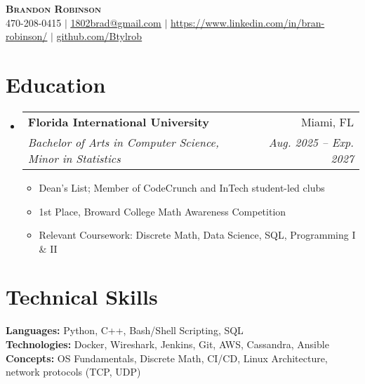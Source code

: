 \documentclass[letterpaper,11pt]{article}
\makeatletter
\newcommand{\resumeItem}[1]{
  \item\small{
    {#1 \vspace{-2pt}}
  }
}
\newcommand{\resumeSubheading}[4]{
  \vspace{-2pt}\item
    \begin{tabular*}{0.97\textwidth}[t]{l@{\extracolsep{\fill}}r}
      \textbf{#1} & #2 \\
      \textit{\small#3} & \textit{\small #4} \\
    \end{tabular*}\vspace{-7pt}
}
\newcommand{\resumeSubHeadingListStart}{\begin{itemize}[leftmargin=0.15in, label={}]}
\newcommand{\resumeSubHeadingListEnd}{\end{itemize}}
\newcommand{\resumeItemListStart}{\begin{itemize}}
\newcommand{\resumeItemListEnd}{\end{itemize}\vspace{-5pt}}
\makeatother
\begin{document}

\begin{center}
    \textbf{\Huge \scshape Brandon Robinson} \\ \vspace{1pt}
    \small 470-208-0415 $|$ \href{mailto:1802brad@gmail.com}{\underline{1802brad@gmail.com}} $|$ 
    \href{https://linkedin.com/in/bran-robisnon}{\underline{https://www.linkedin.com/in/bran-robinson/}} $|$
    \href{https://github.com/btylrob}{\underline{github.com/Btylrob}}
\end{center}


\section{Education}
\resumeSubHeadingListStart
  \resumeSubheading
    {Florida International University}{Miami, FL}
    {Bachelor of Arts in Computer Science, Minor in Statistics}{Aug. 2025 -- Exp. 2027}
    \resumeItemListStart
      \resumeItem{Dean’s List; Member of CodeCrunch and InTech student-led clubs}
      \resumeItem{1st Place, Broward College Math Awareness Competition}
      \resumeItem{Relevant Coursework: Discrete Math, Data Science, SQL, Programming I \& II}
    \resumeItemListEnd
\resumeSubHeadingListEnd


%
\section{Technical Skills}
  \begin{itemize}[leftmargin=0.15in, label={}]
    \small{\item{
      \textbf{Languages:} Python, C++, Bash/Shell Scripting, SQL\\
      \textbf{Technologies:} Docker, Wireshark, Jenkins, Git, AWS, Cassandra, Ansible \\
      \textbf{Concepts:} OS Fundamentals, Discrete Math, CI/CD, Linux Architecture, network protocols (TCP, UDP)
    }}
  \end{itemize}
\end{document}
